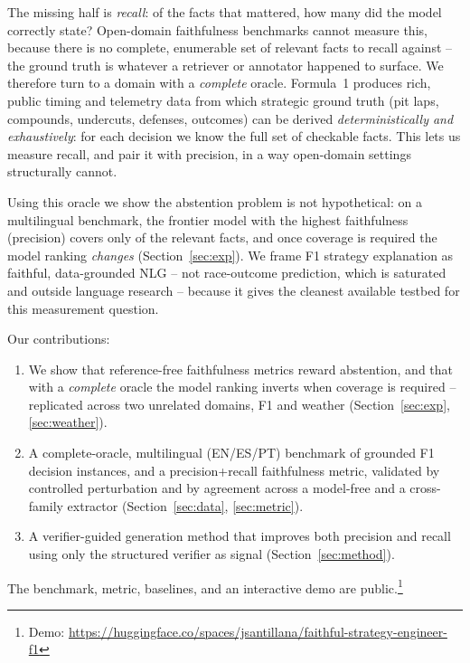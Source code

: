 \documentclass[11pt]{article}
\begin{document}
The missing half is \emph{recall}: of the facts that mattered, how many did the model
correctly state? Open-domain faithfulness benchmarks cannot measure this, because there
is no complete, enumerable set of relevant facts to recall against -- the ground truth
is whatever a retriever or annotator happened to surface. We therefore turn to a domain
with a \emph{complete} oracle. Formula~1 produces rich, public timing and telemetry data
from which strategic ground truth (pit laps, compounds, undercuts, defenses, outcomes)
can be derived \emph{deterministically and exhaustively}: for each decision we know the
full set of checkable facts. This lets us measure recall, and pair it with precision,
in a way open-domain settings structurally cannot.

Using this oracle we show the abstention problem is not hypothetical: on a multilingual
benchmark, the frontier model with the highest faithfulness (precision) covers only
\CovFlipRecall{} of the relevant facts, and once coverage is required the model ranking
\emph{changes} (Section~\ref{sec:exp}). We frame F1 strategy explanation as faithful,
data-grounded NLG -- not race-outcome prediction, which is saturated and outside language
research -- because it gives the cleanest available testbed for this measurement question.

\noindent Our contributions:
\begin{enumerate}
  \item We show that reference-free faithfulness metrics reward abstention, and that with
        a \emph{complete} oracle the model ranking inverts when coverage is required --
        replicated across two unrelated domains, F1 and weather
        (Section~\ref{sec:exp}, \ref{sec:weather}).
  \item A complete-oracle, multilingual (EN/ES/PT) benchmark of \FOneNumInstances{}
        grounded F1 decision instances, and a precision+recall faithfulness metric,
        validated by controlled perturbation and by agreement across a model-free and a
        cross-family extractor (Section~\ref{sec:data}, \ref{sec:metric}).
  \item A verifier-guided generation method that improves both precision and recall using
        only the structured verifier as signal (Section~\ref{sec:method}).
\end{enumerate}
\noindent The benchmark, metric, baselines, and an interactive demo are
public.\footnote{Demo: \url{https://huggingface.co/spaces/jsantillana/faithful-strategy-engineer-f1}}
\end{document}
